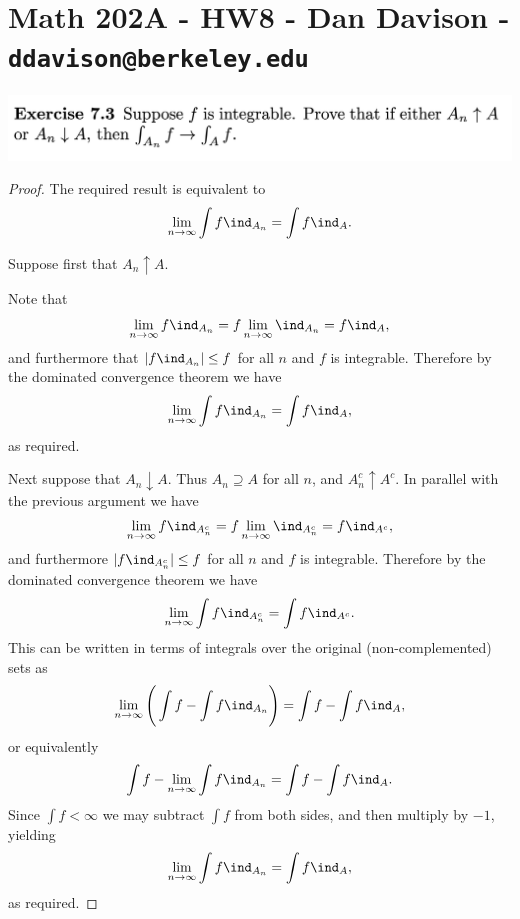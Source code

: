 \section*{Math 202A - HW8 - Dan Davison - \texttt{ddavison@berkeley.edu}}
\begin{mdframed}
\includegraphics[width=400pt]{img/analysis--berkeley-202a-hw08-2798.png}
\end{mdframed}

\begin{proof}
  The required result is equivalent to
  \begin{align*}
    \limn \int f \ind_{A_n} = \int f \ind_A.
  \end{align*}

  Suppose first that $A_n \uparrow A$.

  Note that
  \begin{align*}
    \limn f\ind_{A_n} = f\limn\ind_{A_n} = f\ind_A,
  \end{align*}
  and furthermore that $|f\ind_{A_n}| \leq f$ for all $n$ and $f$ is integrable. Therefore by the dominated
  convergence theorem we have
  \begin{align*}
    \limn \int f \ind_{A_n} = \int f \ind_A,
  \end{align*}
  as required.

  Next suppose that $A_n \downarrow A$. Thus $A_n \supseteq A$ for all $n$, and $A_n^c \uparrow A^c$. In
  parallel with the previous argument we have
  \begin{align*}
    \limn f\ind_{A_n^c} = f\limn\ind_{A_n^c} = f\ind_{A^c},
  \end{align*}
  and furthermore $|f\ind_{A_n^c}| \leq f$ for all $n$ and $f$ is integrable.  Therefore by the dominated
  convergence theorem we have
  \begin{align*}
    \limn \int f \ind_{A_n^c} = \int f \ind_{A^c}.
  \end{align*}
  This can be written in terms of integrals over the original (non-complemented) sets as
  \begin{align*}
    \limn \Bigg(\int f - \int f \ind_{A_n}\Bigg) = \int f - \int f \ind_{A},
  \end{align*}
  or equivalently
  \begin{align*}
    \int f - \limn \int f \ind_{A_n} = \int f - \int f \ind_{A}.
  \end{align*}
  Since $\int f < \infty$ we may subtract $\int f$ from both sides, and then multiply by $-1$, yielding
  \begin{align*}
    \limn \int f \ind_{A_n} = \int f \ind_{A},
  \end{align*}
  as required.
\end{proof}


















